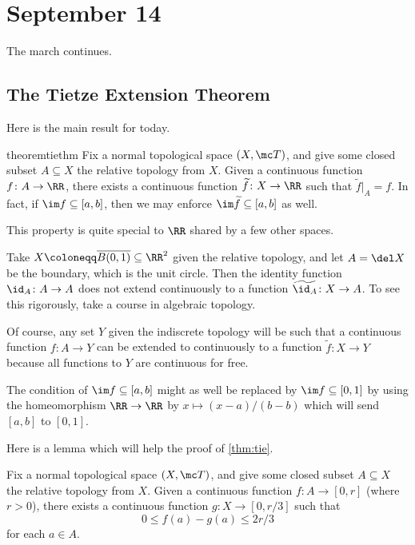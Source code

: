 \documentclass[../notes.tex]{subfiles}
\begin{document}
\section{September 14}

The march continues.

\subsection{The Tietze Extension Theorem}
Here is the main result for today.
\begin{restatable}{theorem}{tiethm} \label{thm:tie}
	Fix a normal topological space $(X,\mc T)$, and give some closed subset $A\subseteq X$ the relative topology from $X$. Given a continuous function $f\colon A\to\RR$, there exists a continuous function $\widetilde f\colon X\to\RR$ such that $\widetilde f|_A=f$. In fact, if $\im f\subseteq[a,b]$, then we may enforce $\im\widetilde f\subseteq[a,b]$ as well.
\end{restatable}
\noindent This property is quite special to $\RR$ shared by a few other spaces.
\begin{example}
	Take $X\coloneqq\overline{B(0,1)}\subseteq\RR^2$ given the relative topology, and let $A=\del X$ be the boundary, which is the unit circle. Then the identity function $\id_A\colon A\to A$ does not extend continuously to a function $\widetilde{\id_A}\colon X\to A$. To see this rigorously, take a course in algebraic topology.
\end{example}
\begin{example}
	Of course, any set $Y$ given the indiscrete topology will be such that a continuous function $f\colon A\to Y$ can be extended to continuously to a function $\widetilde f\colon X\to Y$ because all functions to $Y$ are continuous for free.
\end{example}
\begin{remark}
	The condition of $\im f\subseteq[a,b]$ might as well be replaced by $\im f\subseteq[0,1]$ by using the homeomorphism $\RR\to\RR$ by $x\mapsto(x-a)/(b-b)$ which will send $[a,b]$ to $[0,1]$.
\end{remark}
Here is a lemma which will help the proof of \autoref{thm:tie}.
\begin{lemma} \label{lem:techtie}
	Fix a normal topological space $(X,\mc T)$, and give some closed subset $A\subseteq X$ the relative topology from $X$. Given a continuous function $f\colon A\to[0,r]$ (where $r>0$), there exists a continuous function $g\colon X\to[0,r/3]$ such that
	\[0\le f(a)-g(a)\le2r/3\]
	for each $a\in A$.
\end{lemma}
\end{document}
